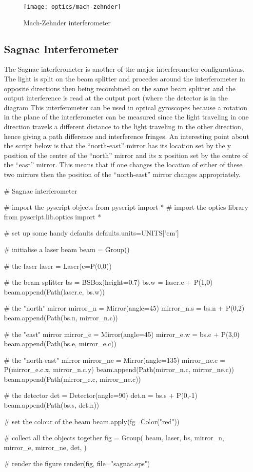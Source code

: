 \begin{figure}[ht]
\centerline{\texttt{[image: optics/mach-zehnder]}}
\caption{Mach-Zehnder interferometer}
\label{fig:mach-zehnder}
\end{figure}

\subsection{Sagnac Interferometer}

The Sagnac interferometer is another of the major interferometer
configurations.  The light is split on the beam splitter and procedes around
the interferometer in opposite directions then being recombined on the same
beam splitter and the output interference is read at the output port (where
the detector is in the diagram  This interferometer can be used in optical
gyroscopes because a rotation in the plane of the interferometer can be
measured since the light traveling in one direction travels a different
distance to the light traveling in the other direction, hence giving a path
difference and interference fringes.  An interesting point about the script
below is that the ``north-east'' mirror has its location set by the y
position of the centre of the ``north'' mirror and its x position set by the
centre of the ``east'' mirror.  This means that if one changes the location
of either of these two mirrors then the position of the ``north-east''
mirror changes appropriately.

\begin{python}
# Sagnac interferometer

# import the pyscript objects
from pyscript import *
# import the optics library
from pyscript.lib.optics import *

# set up some handy defaults
defaults.units=UNITS['cm']

# initialise a laser beam
beam = Group()

# the laser
laser = Laser(c=P(0,0))

# the beam splitter
bs = BSBox(height=0.7)
bs.w = laser.e + P(1,0)
beam.append(Path(laser.e, bs.w))

# the "north" mirror
mirror_n = Mirror(angle=45)
mirror_n.s = bs.n + P(0,2)
beam.append(Path(bs.n, mirror_n.c))

# the "east" mirror
mirror_e = Mirror(angle=45)
mirror_e.w = bs.e + P(3,0)
beam.append(Path(bs.e, mirror_e.c))

# the "north-east" mirror
mirror_ne = Mirror(angle=135)
mirror_ne.c = P(mirror_e.c.x, mirror_n.c.y)
beam.append(Path(mirror_n.c, mirror_ne.c))
beam.append(Path(mirror_e.c, mirror_ne.c))

# the detector
det = Detector(angle=90)
det.n = bs.s + P(0,-1)
beam.append(Path(bs.s, det.n))

# set the colour of the beam
beam.apply(fg=Color("red"))

# collect all the objects together
fig = Group(
        beam,
        laser,
        bs,
        mirror_n, mirror_e, mirror_ne,
        det,
        )

# render the figure
render(fig, 
        file="sagnac.eps")
\end{python}

